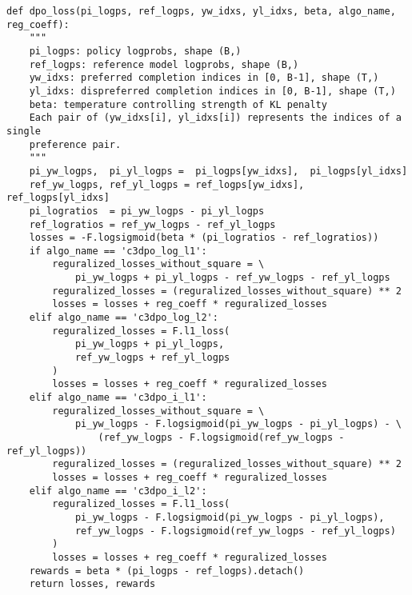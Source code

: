     \begin{verbatim}
def dpo_loss(pi_logps, ref_logps, yw_idxs, yl_idxs, beta, algo_name, reg_coeff):
    """
    pi_logps: policy logprobs, shape (B,)
    ref_logps: reference model logprobs, shape (B,)
    yw_idxs: preferred completion indices in [0, B-1], shape (T,)
    yl_idxs: dispreferred completion indices in [0, B-1], shape (T,)
    beta: temperature controlling strength of KL penalty
    Each pair of (yw_idxs[i], yl_idxs[i]) represents the indices of a single
    preference pair.
    """
    pi_yw_logps,  pi_yl_logps =  pi_logps[yw_idxs],  pi_logps[yl_idxs]
    ref_yw_logps, ref_yl_logps = ref_logps[yw_idxs], ref_logps[yl_idxs]
    pi_logratios  = pi_yw_logps - pi_yl_logps
    ref_logratios = ref_yw_logps - ref_yl_logps
    losses = -F.logsigmoid(beta * (pi_logratios - ref_logratios))
    if algo_name == 'c3dpo_log_l1':
        reguralized_losses_without_square = \
            pi_yw_logps + pi_yl_logps - ref_yw_logps - ref_yl_logps
        reguralized_losses = (reguralized_losses_without_square) ** 2
        losses = losses + reg_coeff * reguralized_losses
    elif algo_name == 'c3dpo_log_l2':
        reguralized_losses = F.l1_loss(
            pi_yw_logps + pi_yl_logps,
            ref_yw_logps + ref_yl_logps
        )
        losses = losses + reg_coeff * reguralized_losses
    elif algo_name == 'c3dpo_i_l1':
        reguralized_losses_without_square = \
            pi_yw_logps - F.logsigmoid(pi_yw_logps - pi_yl_logps) - \
                (ref_yw_logps - F.logsigmoid(ref_yw_logps - ref_yl_logps))
        reguralized_losses = (reguralized_losses_without_square) ** 2
        losses = losses + reg_coeff * reguralized_losses
    elif algo_name == 'c3dpo_i_l2':
        reguralized_losses = F.l1_loss(
            pi_yw_logps - F.logsigmoid(pi_yw_logps - pi_yl_logps),
            ref_yw_logps - F.logsigmoid(ref_yw_logps - ref_yl_logps)
        )
        losses = losses + reg_coeff * reguralized_losses
    rewards = beta * (pi_logps - ref_logps).detach()
    return losses, rewards
    \end{verbatim}

